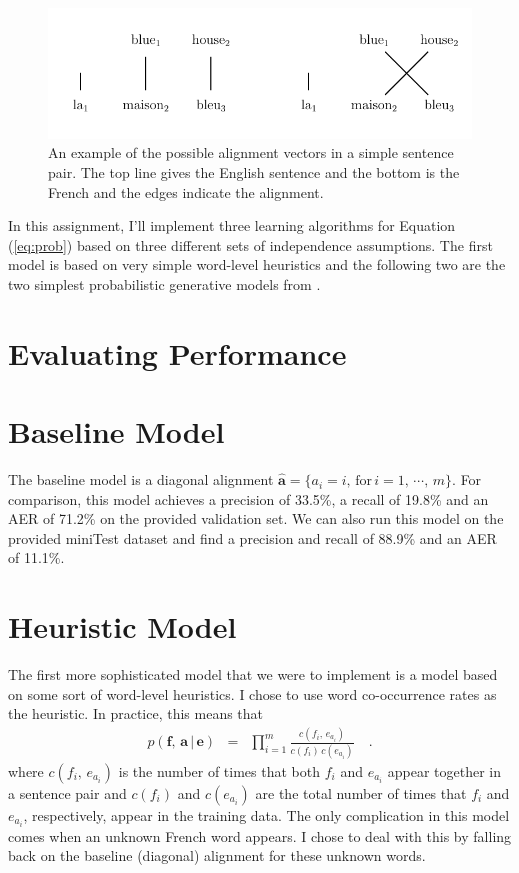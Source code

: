 \documentclass[11pt]{article}
\newcommand{\eq}[1]{Equation (\ref{eq:#1})}
\newcommand{\figlabel}[1]{\label{fig:#1}}
\newcommand{\bvec}[1]{\ensuremath{\boldsymbol{#1}}}
\newcommand{\code}[1]{{\sffamily #1}}
\begin{document}
\begin{figure}[htbp]
\begin{center}
    \includegraphics{fig1.pdf}
\end{center}
\caption{%
An example of the possible alignment vectors in a simple sentence pair.
The top line gives the English sentence and the bottom is the French and the
edges indicate the alignment.
\figlabel{blue-house}}
\end{figure}

In this assignment, I'll implement three learning algorithms for \eq{prob}
based on three different sets of independence assumptions.
The first model is based on very simple word-level heuristics and the
following two are the two simplest probabilistic generative models from
\citet{ibm}.

\section{Evaluating Performance}

\section{Baseline Model}

The baseline model is a diagonal alignment $\hat{\bvec{a}} = \{a_i =
i,\,\mathrm{for}\,i=1,\,\cdots,\,m\}$.
For comparison, this model achieves a precision of 33.5\%, a recall of 19.8\%
and an AER of 71.2\% on the provided validation set.
We can also run this model on the provided \code{miniTest} dataset and find a
precision and recall of 88.9\% and an AER of 11.1\%.

\section{Heuristic Model}

The first more sophisticated model that we were to implement is a model based
on some sort of word-level heuristics.
I chose to use word co-occurrence rates as the heuristic.
In practice, this means that
\begin{eqnarray}
p(\bvec{f},\,\bvec{a}\,|\,\bvec{e}) &=&
    \prod_{i=1}^m \frac{c(f_i,\,e_{a_i})}{c(f_i)\,c(e_{a_i})} \quad.
\end{eqnarray}
where $c(f_i,\,e_{a_i})$ is the number of times that both $f_i$ and $e_{a_i}$
appear together in a sentence pair and $c(f_i)$ and $c(e_{a_i})$ are the
total number of times that $f_i$ and $e_{a_i}$, respectively, appear in the
training data.
The only complication in this model comes when an unknown French word appears.
I chose to deal with this by falling back on the baseline (diagonal) alignment
for these unknown words.
\end{document}
